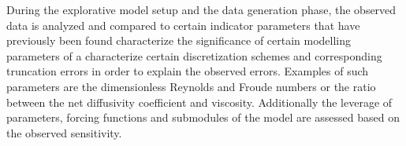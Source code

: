 During the explorative model setup and the data generation phase, the
observed data is analyzed and compared to certain indicator parameters
that have previously been found characterize the significance of certain
modelling parameters \citep{Shin2004} of a characterize certain
discretization schemes and corresponding truncation errors in order to
explain the observed errors. Examples of such parameters are the
dimensionless Reynolds and Froude numbers or the ratio between the net
diffusivity coefficient and viscosity. Additionally the leverage of
parameters, forcing functions and submodules of the model are assessed
based on the observed sensitivity.
